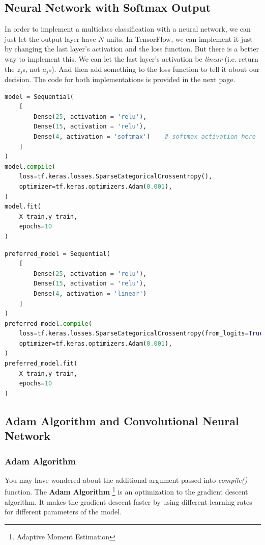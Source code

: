 \documentclass[a4paper, 12pt]{book}
\begin{document}
\subsection{Neural Network with Softmax Output}
In order to implement a multiclass classification with a neural network, we can just let the output layer have $N$ units. In TensorFlow, we can implement it just by changing the last layer's activation and the loss function. But there is a better way to implement this. We can let the last layer's activation be \emph{linear} (i.e. return the $z_j$s, not $a_j$s). And then add something to the loss function to tell it about our decision. The code for both implementations is provided in the next page.

\begin{lstlisting}[language=Python, caption={normal implementation}]
model = Sequential(
    [ 
        Dense(25, activation = 'relu'),
        Dense(15, activation = 'relu'),
        Dense(4, activation = 'softmax')    # softmax activation here
    ]
)
model.compile(
    loss=tf.keras.losses.SparseCategoricalCrossentropy(),
    optimizer=tf.keras.optimizers.Adam(0.001),
)
model.fit(
    X_train,y_train,
    epochs=10
)
\end{lstlisting}
\begin{lstlisting}[language=Python, caption={preferred implementation}]
preferred_model = Sequential(
    [ 
        Dense(25, activation = 'relu'),
        Dense(15, activation = 'relu'),
        Dense(4, activation = 'linear')
    ]
)
preferred_model.compile(
    loss=tf.keras.losses.SparseCategoricalCrossentropy(from_logits=True),
    optimizer=tf.keras.optimizers.Adam(0.001),
)
preferred_model.fit(
    X_train,y_train,
    epochs=10
)
\end{lstlisting}

\subsection{Adam Algorithm and Convolutional Neural Network}
\subsubsection{Adam Algorithm}
You may have wondered about the additional argument passed into \emph{compile()} function. The \textbf{Adam Algorithm} \footnote{Adaptive Moment Estimation} is an optimization to the gradient descent algorithm. It makes the gradient descent faster by using different learning rates for different parameters of the model.
\end{document}

